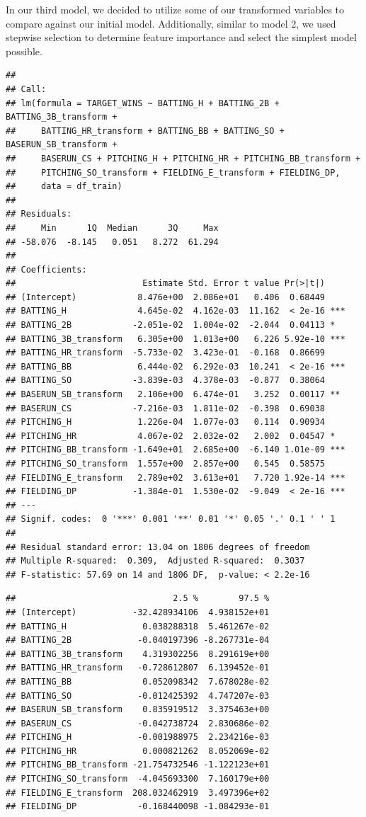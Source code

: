 \documentclass[
]{article}
\begin{document}
In our third model, we decided to utilize some of our transformed
variables to compare against our initial model. Additionally, similar to
model 2, we used stepwise selection to determine feature importance and
select the simplest model possible.

\begin{verbatim}
## 
## Call:
## lm(formula = TARGET_WINS ~ BATTING_H + BATTING_2B + BATTING_3B_transform + 
##     BATTING_HR_transform + BATTING_BB + BATTING_SO + BASERUN_SB_transform + 
##     BASERUN_CS + PITCHING_H + PITCHING_HR + PITCHING_BB_transform + 
##     PITCHING_SO_transform + FIELDING_E_transform + FIELDING_DP, 
##     data = df_train)
## 
## Residuals:
##     Min      1Q  Median      3Q     Max 
## -58.076  -8.145   0.051   8.272  61.294 
## 
## Coefficients:
##                         Estimate Std. Error t value Pr(>|t|)    
## (Intercept)            8.476e+00  2.086e+01   0.406  0.68449    
## BATTING_H              4.645e-02  4.162e-03  11.162  < 2e-16 ***
## BATTING_2B            -2.051e-02  1.004e-02  -2.044  0.04113 *  
## BATTING_3B_transform   6.305e+00  1.013e+00   6.226 5.92e-10 ***
## BATTING_HR_transform  -5.733e-02  3.423e-01  -0.168  0.86699    
## BATTING_BB             6.444e-02  6.292e-03  10.241  < 2e-16 ***
## BATTING_SO            -3.839e-03  4.378e-03  -0.877  0.38064    
## BASERUN_SB_transform   2.106e+00  6.474e-01   3.252  0.00117 ** 
## BASERUN_CS            -7.216e-03  1.811e-02  -0.398  0.69038    
## PITCHING_H             1.226e-04  1.077e-03   0.114  0.90934    
## PITCHING_HR            4.067e-02  2.032e-02   2.002  0.04547 *  
## PITCHING_BB_transform -1.649e+01  2.685e+00  -6.140 1.01e-09 ***
## PITCHING_SO_transform  1.557e+00  2.857e+00   0.545  0.58575    
## FIELDING_E_transform   2.789e+02  3.613e+01   7.720 1.92e-14 ***
## FIELDING_DP           -1.384e-01  1.530e-02  -9.049  < 2e-16 ***
## ---
## Signif. codes:  0 '***' 0.001 '**' 0.01 '*' 0.05 '.' 0.1 ' ' 1
## 
## Residual standard error: 13.04 on 1806 degrees of freedom
## Multiple R-squared:  0.309,  Adjusted R-squared:  0.3037 
## F-statistic: 57.69 on 14 and 1806 DF,  p-value: < 2.2e-16
\end{verbatim}

\begin{verbatim}
##                               2.5 %        97.5 %
## (Intercept)           -32.428934106  4.938152e+01
## BATTING_H               0.038288318  5.461267e-02
## BATTING_2B             -0.040197396 -8.267731e-04
## BATTING_3B_transform    4.319302256  8.291619e+00
## BATTING_HR_transform   -0.728612807  6.139452e-01
## BATTING_BB              0.052098342  7.678028e-02
## BATTING_SO             -0.012425392  4.747207e-03
## BASERUN_SB_transform    0.835919512  3.375463e+00
## BASERUN_CS             -0.042738724  2.830686e-02
## PITCHING_H             -0.001988975  2.234216e-03
## PITCHING_HR             0.000821262  8.052069e-02
## PITCHING_BB_transform -21.754732546 -1.122123e+01
## PITCHING_SO_transform  -4.045693300  7.160179e+00
## FIELDING_E_transform  208.032462919  3.497396e+02
## FIELDING_DP            -0.168440098 -1.084293e-01
\end{verbatim}
\end{document}
